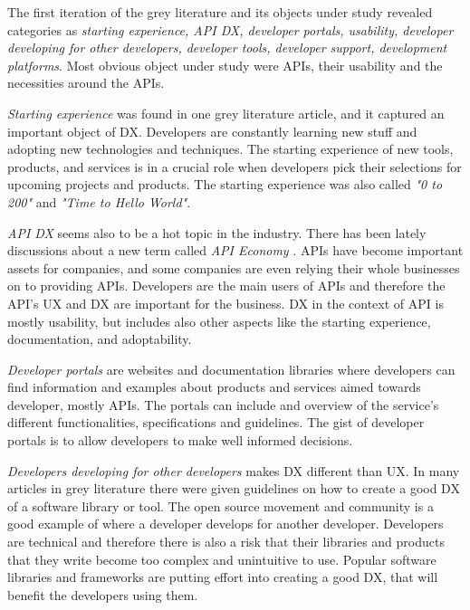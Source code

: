\documentclass[english, 12pt, a4paper, sci, utf8, a-1b, online]{aaltothesis}
\newcounter{subsubsubsection}[subsubsection]
\begin{document}

The first iteration of the grey literature and its objects under study revealed categories as \textit{starting experience, API DX, developer portals, usability, developer developing for other developers, developer tools, developer support, development platforms}. Most obvious object under study were APIs, their usability and the necessities around the APIs.

\textit{Starting experience} was found in one grey literature article, and it captured an important object of DX. Developers are constantly learning new stuff and adopting new technologies and techniques. The starting experience of new tools, products, and services is in a crucial role when developers pick their selections for upcoming projects and products. The starting experience was also called \textit{"0 to 200"} and \textit{"Time to Hello World"}.

\textit{API DX} seems also to be a hot topic in the industry. There has been lately discussions about a new term called \textit{API Economy} \textcite{web-api-economy}. APIs have become important assets for companies, and some companies are even relying their whole businesses on to providing APIs. Developers are the main users of APIs and therefore the API's UX and DX are important for the business. DX in the context of API is mostly usability, but includes also other aspects like the starting experience, documentation, and adoptability.

\textit{Developer portals} are websites and documentation libraries where developers can find information and examples about products and services aimed towards developer, mostly APIs. The portals can include and overview of the service's different functionalities, specifications and guidelines. The gist of developer portals is to allow developers to make well informed decisions.

\textit{Developers developing for other developers} makes DX different than UX. In many articles in grey literature there were given guidelines on how to create a good DX of a software library or tool. The open source movement and community is a good example of where a developer develops for another developer. Developers are technical and therefore there is also a risk that their libraries and products that they write become too complex and unintuitive to use. Popular software libraries and frameworks are putting effort into creating a good DX, that will benefit the developers using them.
\end{document}
